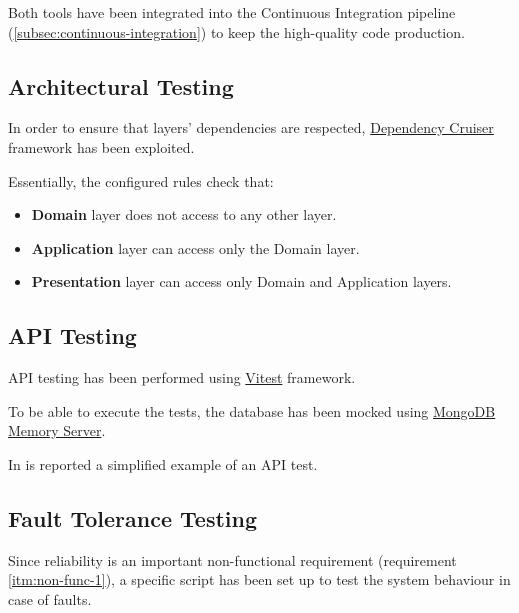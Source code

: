 \documentclass{scrartcl}
\begin{document}
    Both tools have been integrated into the Continuous Integration pipeline (\cref{subsec:continuous-integration}) to keep the high-quality code production.

    \subsection{Architectural Testing}\label{subsec:architecture-testing}

     In order to ensure that layers' dependencies are respected, \href{https://github.com/sverweij/dependency-cruiser}{Dependency Cruiser} framework has been exploited.

    Essentially, the configured rules check that:

    \begin{itemize}
        \item \textbf{Domain} layer does not access to any other layer.
        \item \textbf{Application} layer can access only the Domain layer.
        \item \textbf{Presentation} layer can access only Domain and Application layers.
    \end{itemize}

    \subsection{API Testing}\label{subsec:api-testing}

    API testing has been performed using \href{https://vitest.dev/}{Vitest} framework.

    To be able to execute the tests, the database has been mocked using \href{https://github.com/nodkz/mongodb-memory-server}{MongoDB Memory Server}.

    In  is reported a simplified example of an API test.

    


    \subsection{Fault Tolerance Testing}\label{subsec:fault-tolerance-testing}

    Since reliability is an important non-functional requirement (requirement \ref{itm:non-func-1}),
    a specific script has been set up to test the system behaviour in case of faults.
\end{document}
